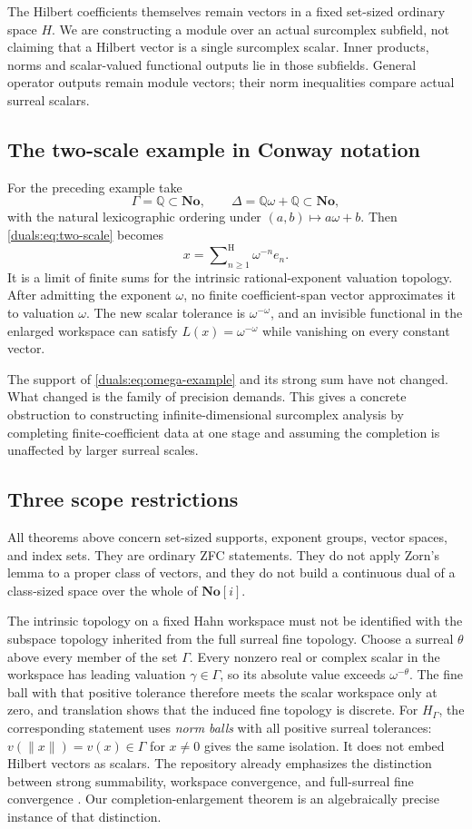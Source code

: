 \documentclass[11pt,letterpaper]{article}
\numberwithin{equation}{section}
\theoremstyle{definition}
\theoremstyle{remark}
\newcommand{\Q}{\mathbb Q}
\newcommand{\No}{\mathbf{No}}
\newcommand{\sH}{\mathop{\sum}\nolimits^{\mathrm H}}
\newcommand{\norm}[1]{\lVert#1\rVert}
\begin{document}
The Hilbert coefficients themselves remain vectors in a fixed set-sized
ordinary space $H$. We are constructing a module over an actual
surcomplex subfield, not claiming that a Hilbert vector is a single
surcomplex scalar. Inner products, norms and scalar-valued functional
outputs lie in those subfields. General operator outputs remain module
vectors; their norm inequalities compare actual surreal scalars.

\subsection{The two-scale example in Conway notation}
For the preceding example take
\[
 \Gamma=\Q\subset\No,\qquad
 \Delta=\Q\omega+\Q\subset\No,
\]
with the natural lexicographic ordering under
$(a,b)\mapsto a\omega+b$. Then \eqref{duals:eq:two-scale} becomes
\begin{equation}\label{duals:eq:omega-example}
 x=\sH_{n\ge1}\omega^{-n}e_n.
\end{equation}
It is a limit of finite sums for the intrinsic rational-exponent
valuation topology. After admitting the exponent $\omega$, no finite
coefficient-span vector approximates it to valuation $\omega$.
The new scalar tolerance is $\omega^{-\omega}$, and an invisible
functional in the enlarged workspace can satisfy
$L(x)=\omega^{-\omega}$ while vanishing on every constant vector.

The support of \eqref{duals:eq:omega-example} and its strong sum have not
changed. What changed is the family of precision demands. This gives a
concrete obstruction to constructing infinite-dimensional surcomplex
analysis by completing finite-coefficient data at one stage and
assuming the completion is unaffected by larger surreal scales.

\subsection{Three scope restrictions}
All theorems above concern set-sized supports, exponent groups, vector
spaces, and index sets. They are ordinary ZFC statements. They do not
apply Zorn's lemma to a proper class of vectors, and they do not build a
continuous dual of a class-sized space over the whole of $\No[i]$.

The intrinsic topology on a fixed Hahn workspace must not be identified
with the subspace topology inherited from the full surreal fine
topology. Choose a surreal $\theta$ above every member of the set
$\Gamma$. Every nonzero real or complex scalar in the workspace has
leading valuation $\gamma\in\Gamma$, so its absolute value exceeds
$\omega^{-\theta}$. The fine ball with that positive tolerance
therefore meets the scalar workspace only at zero, and translation
shows that the induced fine topology is discrete. For $H_\Gamma$,
the corresponding statement uses \emph{norm balls} with all positive
surreal tolerances: $v(\norm{x})=v(x)\in\Gamma$ for $x\ne0$ gives
the same isolation. It does not embed Hilbert vectors as scalars. The repository already emphasizes the distinction between
strong summability, workspace convergence, and full-surreal fine
convergence \cite{RepoInventory}. Our completion-enlargement theorem
is an algebraically precise instance of that distinction.
\end{document}
